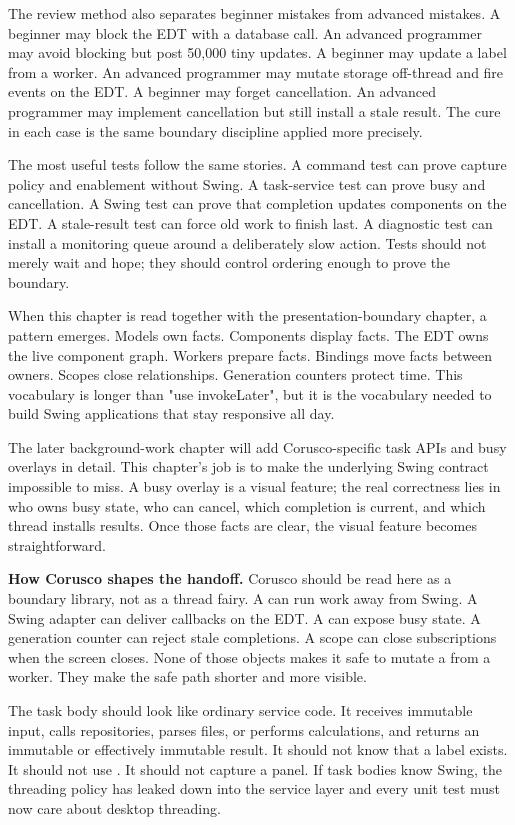 The review method also separates beginner mistakes from advanced mistakes. A beginner may block the EDT with a database call. An advanced programmer may avoid blocking but post 50,000 tiny updates. A beginner may update a label from a worker. An advanced programmer may mutate storage off-thread and fire events on the EDT. A beginner may forget cancellation. An advanced programmer may implement cancellation but still install a stale result. The cure in each case is the same boundary discipline applied more precisely.

The most useful tests follow the same stories. A command test can prove capture policy and enablement without Swing. A task-service test can prove busy and cancellation. A Swing test can prove that completion updates components on the EDT. A stale-result test can force old work to finish last. A diagnostic test can install a monitoring queue around a deliberately slow action. Tests should not merely wait and hope; they should control ordering enough to prove the boundary.

When this chapter is read together with the presentation-boundary chapter, a pattern emerges. Models own facts. Components display facts. The EDT owns the live component graph. Workers prepare facts. Bindings move facts between owners. Scopes close relationships. Generation counters protect time. This vocabulary is longer than "use invokeLater", but it is the vocabulary needed to build Swing applications that stay responsive all day.

The later background-work chapter will add Corusco-specific task APIs and busy overlays in detail. This chapter's job is to make the underlying Swing contract impossible to miss. A busy overlay is a visual feature; the real correctness lies in who owns busy state, who can cancel, which completion is current, and which thread installs results. Once those facts are clear, the visual feature becomes straightforward.

\textbf{How Corusco shapes the handoff.} Corusco should be read here as a boundary library, not as a thread fairy. A  can run work away from Swing. A Swing adapter can deliver callbacks on the EDT. A  can expose busy state. A generation counter can reject stale completions. A scope can close subscriptions when the screen closes. None of those objects makes it safe to mutate a  from a worker. They make the safe path shorter and more visible.

The task body should look like ordinary service code. It receives immutable input, calls repositories, parses files, or performs calculations, and returns an immutable or effectively immutable result. It should not know that a label exists. It should not use . It should not capture a panel. If task bodies know Swing, the threading policy has leaked down into the service layer and every unit test must now care about desktop threading.

